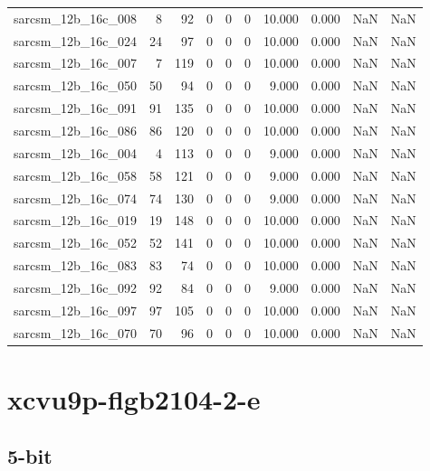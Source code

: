 \documentclass{article}
\begin{document}
\begin{longtable}{lrrrrrrrrr}
sarcsm\_12b\_16c\_008 & 8 & 92 & 0 & 0 & 0 & 10.000 & 0.000 & NaN & NaN \\
sarcsm\_12b\_16c\_024 & 24 & 97 & 0 & 0 & 0 & 10.000 & 0.000 & NaN & NaN \\
sarcsm\_12b\_16c\_007 & 7 & 119 & 0 & 0 & 0 & 10.000 & 0.000 & NaN & NaN \\
sarcsm\_12b\_16c\_050 & 50 & 94 & 0 & 0 & 0 & 9.000 & 0.000 & NaN & NaN \\
sarcsm\_12b\_16c\_091 & 91 & 135 & 0 & 0 & 0 & 10.000 & 0.000 & NaN & NaN \\
sarcsm\_12b\_16c\_086 & 86 & 120 & 0 & 0 & 0 & 10.000 & 0.000 & NaN & NaN \\
sarcsm\_12b\_16c\_004 & 4 & 113 & 0 & 0 & 0 & 9.000 & 0.000 & NaN & NaN \\
sarcsm\_12b\_16c\_058 & 58 & 121 & 0 & 0 & 0 & 9.000 & 0.000 & NaN & NaN \\
sarcsm\_12b\_16c\_074 & 74 & 130 & 0 & 0 & 0 & 9.000 & 0.000 & NaN & NaN \\
sarcsm\_12b\_16c\_019 & 19 & 148 & 0 & 0 & 0 & 10.000 & 0.000 & NaN & NaN \\
sarcsm\_12b\_16c\_052 & 52 & 141 & 0 & 0 & 0 & 10.000 & 0.000 & NaN & NaN \\
sarcsm\_12b\_16c\_083 & 83 & 74 & 0 & 0 & 0 & 10.000 & 0.000 & NaN & NaN \\
sarcsm\_12b\_16c\_092 & 92 & 84 & 0 & 0 & 0 & 9.000 & 0.000 & NaN & NaN \\
sarcsm\_12b\_16c\_097 & 97 & 105 & 0 & 0 & 0 & 10.000 & 0.000 & NaN & NaN \\
sarcsm\_12b\_16c\_070 & 70 & 96 & 0 & 0 & 0 & 10.000 & 0.000 & NaN & NaN \\
\end{longtable}

\section*{xcvu9p-flgb2104-2-e}
\subsection*{5-bit}
\end{document}
